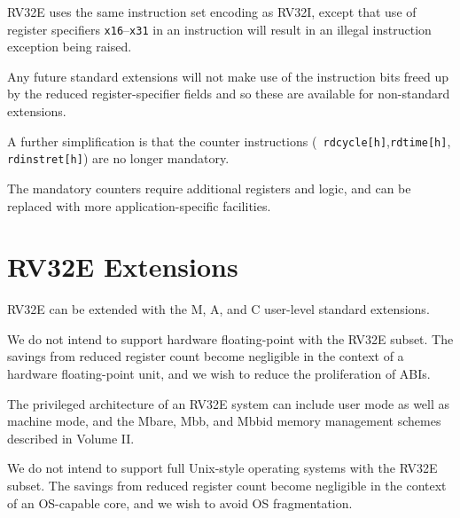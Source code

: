 RV32E uses the same instruction set encoding as RV32I, except that use
of register specifiers {\tt x16}--{\tt x31} in an instruction will
result in an illegal instruction exception being raised.

\begin{commentary}
Any future standard extensions will not make use of the instruction
bits freed up by the reduced register-specifier fields and so these
are available for non-standard extensions.
\end{commentary}

A further simplification is that the counter instructions ({\tt
  rdcycle[h]},{\tt rdtime[h]}, {\tt rdinstret[h]}) are no longer
mandatory.

\begin{commentary}
The mandatory counters require additional registers and logic, and can
be replaced with more application-specific facilities.
\end{commentary}

\section{RV32E Extensions}

RV32E can be extended with the M, A, and C user-level standard extensions.

\begin{commentary}
We do not intend to support hardware floating-point with the RV32E
subset.  The savings from reduced register count become negligible in
the context of a hardware floating-point unit, and we wish to reduce
the proliferation of ABIs.
\end{commentary}

The privileged architecture of an RV32E system can include user mode
as well as machine mode, and the Mbare, Mbb, and Mbbid memory
management schemes described in Volume II.

\begin{commentary}
We do not intend to support full Unix-style operating systems with the
RV32E subset.  The savings from reduced register count become
negligible in the context of an OS-capable core, and we wish to avoid
OS fragmentation.
\end{commentary}



